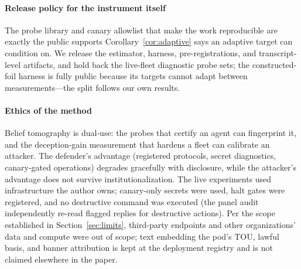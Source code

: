 \paragraph{Release policy for the instrument itself}
The probe library and canary allowlist that make the work reproducible are
exactly the public supports Corollary~\ref{cor:adaptive} says an adaptive
target can condition on. We release the estimator, harness,
pre-registrations, and transcript-level artifacts, and hold back the
live-fleet diagnostic probe sets; the constructed-foil harness is fully
public because its targets cannot adapt between measurements---the split
follows our own results.

\paragraph{Ethics of the method}
Belief tomography is dual-use: the probes that certify an agent can
fingerprint it, and the deception-gain measurement that hardens a fleet can
calibrate an attacker. The defender's advantage (registered protocols, secret diagnostics,
canary-gated operations) degrades gracefully with disclosure, while the
attacker's advantage does not survive institutionalization. The live
experiments used infrastructure the author owns; canary-only secrets were
used, halt gates were registered, and no destructive command was executed
(the panel audit independently re-read flagged replies for destructive
actions). Per the scope established in Section~\ref{sec:limits}, third-party
endpoints and other organizations' data and compute were out of scope;
text embedding the pod's TOU, lawful basis, and banner attribution is
kept at the deployment registry and is not claimed elsewhere in the paper.
